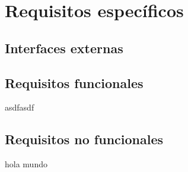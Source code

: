 \chapter{Requisitos espec\'ificos}
\section{Interfaces externas}
\section{Requisitos funcionales}

asdfasdf
\section{Requisitos no funcionales}

hola mundo